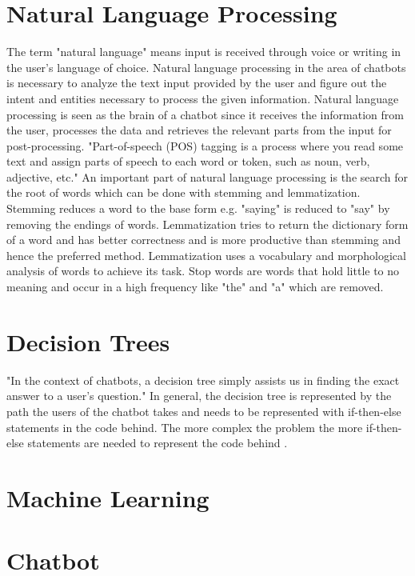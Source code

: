 \documentclass[12pt, backref]{report}
\begin{document}
\section{Natural Language Processing}	
The term "natural language" means input is received through voice or writing in the user's language of choice.
Natural language processing in the area of chatbots is necessary to analyze the text input provided by the user and figure out the intent and entities necessary to process the given information. 
Natural language processing is seen as the brain of a chatbot since it receives the information from the user, processes the data and retrieves the relevant parts from the input for post-processing.
"Part-of-speech (POS) tagging is a process where you read some text and assign parts of
speech to each word or token, such as noun, verb, adjective, etc."\cite{buiildChatbotsPython}
An important part of natural language processing is the search for the root of words which can be done with stemming and lemmatization.
Stemming reduces a word to the base form e.g. "saying" is reduced to "say" by removing the endings of words.
Lemmatization tries to return the dictionary form of a word and has better correctness and is more productive than stemming and hence the preferred method. Lemmatization uses a vocabulary and morphological analysis of words to achieve its task.
Stop words are words that hold little to no meaning and occur in a high frequency like "the" and "a" which are removed.

\section{Decision Trees}
"In the context of chatbots, a decision tree simply assists us in finding the exact answer to
a user’s question."\cite{buiildChatbotsPython}
In general, the decision tree is represented by the path the users of the chatbot takes and needs to be represented with if-then-else statements in the code behind. The more complex the problem the more if-then-else statements are needed to represent the code behind \cite{buiildChatbotsPython}. 
\section{Machine Learning}

\section{Chatbot}
\end{document}
